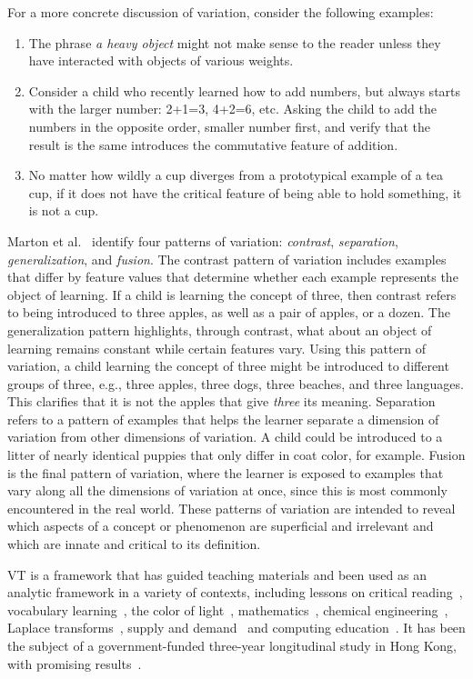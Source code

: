 For a more concrete discussion of variation, consider the following examples:
\begin{enumerate}
\item The phrase {\it a heavy object} might not make sense to the reader unless they have interacted with objects of various weights.
\item Consider a child who recently learned how to add numbers, but always starts with the larger number: 2+1=3, 4+2=6, etc. Asking the child to add the numbers in the opposite order, smaller number first, and verify that the result is the same introduces the commutative feature of addition.
\item No matter how wildly a cup diverges from a prototypical example of a tea cup, if it does not have the critical feature of being able to hold something, it is not a cup.
\end{enumerate}

Marton et al.~\cite{marton1997learning} identify four patterns of variation: {\it contrast}, {\it separation}, {\it generalization}, and {\it fusion}. The contrast pattern of variation includes examples that differ by feature values that determine whether each example represents the object of learning. If a child is learning the concept of three, then contrast refers to being introduced to three apples, as well as a pair of apples, or a dozen. The generalization pattern highlights, through contrast, what about an object of learning remains constant while certain features vary. Using this pattern of variation, a child learning the concept of three might be introduced to different groups of three, e.g., three apples, three dogs, three beaches, and three languages. This clarifies that it is not the apples that give {\it three} its meaning. Separation refers to a pattern of examples that helps the learner separate a dimension of variation from other dimensions of variation. A child could be introduced to a litter of nearly identical puppies that only differ in coat color, for example. Fusion is the final pattern of variation, where the learner is exposed to examples that vary along all the dimensions of variation at once, since this is most commonly encountered in the real world. These patterns of variation are intended to reveal which aspects of a concept or phenomenon are superficial and irrelevant and which are innate and critical to its definition.

VT is a framework that has guided teaching materials and been used as an analytic framework in a variety of contexts, including lessons on critical reading~\cite{noble1998contents}, vocabulary learning~\cite{doi:10.1108/IJLLS-10-2014-0038}, the color of light~\cite{Ling2006}, mathematics~\cite{Pythagoras233}, chemical engineering~\cite{C2RP20145C}, Laplace transforms~\cite{carstensen2004laplace}, supply and demand~\cite{marton2006some} and computing education~\cite{suhonen2007applications}. It has been the subject of a government-funded three-year longitudinal study in Hong Kong, with promising results~\cite{lo2005each}. 

